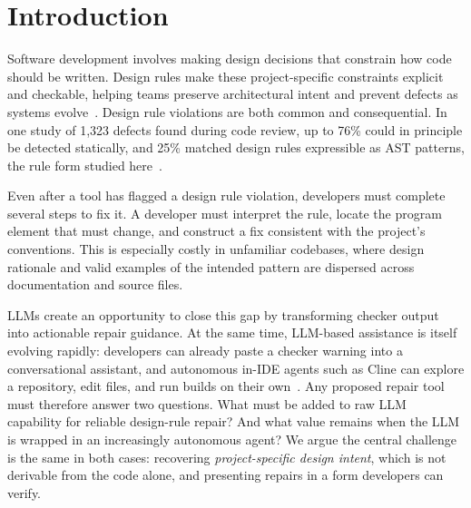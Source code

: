 

\maketitle

\section{Introduction}
\label{sec:introduction}
Software development involves making design decisions that constrain
how code should be written. Design rules make these project-specific
constraints explicit and checkable, helping teams preserve
architectural intent and prevent defects as systems
evolve~\cite{mehrpour2019active}.
Design rule violations are both common and consequential. In one study of 1,323 defects found during code review, up to 76\% could in principle be detected statically, and 25\% matched design rules expressible as AST patterns, the rule form studied here~\cite{mehrpour2023canstatic}. 

Even after a tool has flagged a design rule violation, developers must complete several steps to fix it. A developer
must interpret the rule, locate the program element that must change, and construct
a fix consistent with the project's conventions. This is especially
costly in unfamiliar codebases, where design rationale and valid
examples of the intended pattern are dispersed across documentation and
source files.

LLMs create an opportunity to close this gap by
transforming checker output into actionable repair guidance. At the
same time, LLM-based assistance is itself evolving rapidly: developers
can already paste a checker warning into a conversational assistant,
and autonomous in-IDE agents such as Cline can explore
a repository, edit files, and run builds on their
own~\cite{anthropic2026claudecodeoverview,cline2026,liu2026llmagentsurvey}.
Any proposed repair tool must therefore answer two questions. What must
be added to raw LLM capability for reliable design-rule repair? And
what value remains when the LLM is wrapped in an increasingly
autonomous agent? We argue the central challenge is the same in both
cases: recovering \emph{project-specific design intent}, which is not
derivable from the code alone, and presenting repairs in a form
developers can verify.

